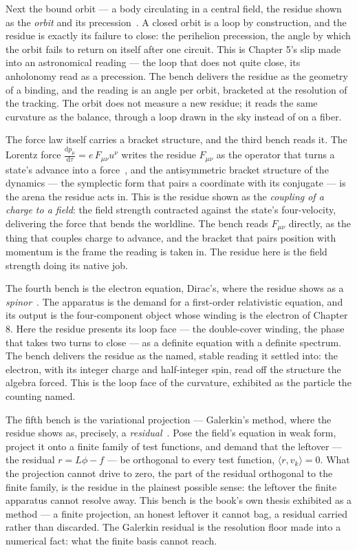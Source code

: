 Next the bound orbit --- a body circulating in a central field, the residue shown as the \emph{orbit} and its
precession~\cite{newton1687,goldstein2002}. A closed orbit is a loop by construction, and the residue is exactly its failure
to close: the perihelion precession, the angle by which the orbit fails to return on itself after one circuit. This is
Chapter 5's slip made into an astronomical reading --- the loop that does not quite close, its anholonomy read as a
precession. The bench delivers the residue as the geometry of a binding, and the reading is an angle per orbit, bracketed at
the resolution of the tracking. The orbit does not measure a new residue; it reads the same curvature as the balance, through
a loop drawn in the sky instead of on a fiber.

The force law itself carries a bracket structure, and the third bench reads it. The Lorentz force $\frac{\mathrm{d}p_\mu}
{\mathrm{d}\tau} = e\,F_{\mu\nu}u^\nu$ writes the residue $F_{\mu\nu}$ as the operator that turns a state's advance into a
force~\cite{lorentz1904}, and the antisymmetric bracket structure of the dynamics --- the symplectic form that pairs a
coordinate with its conjugate --- is the arena the residue acts in. This is the residue shown as the \emph{coupling of a
charge to a field}: the field strength contracted against the state's four-velocity, delivering the force that bends the
worldline. The bench reads $F_{\mu\nu}$ directly, as the thing that couples charge to advance, and the bracket that pairs
position with momentum is the frame the reading is taken in. The residue here is the field strength doing its native job.

The fourth bench is the electron equation, Dirac's, where the residue shows as a \emph{spinor}~\cite{dirac1928}. The
apparatus is the demand for a first-order relativistic equation, and its output is the four-component object whose winding is
the electron of Chapter 8. Here the residue presents its loop face --- the double-cover winding, the phase that takes two
turns to close --- as a definite equation with a definite spectrum. The bench delivers the residue as the named, stable
reading it settled into: the electron, with its integer charge and half-integer spin, read off the structure the algebra
forced. This is the loop face of the curvature, exhibited as the particle the counting named.

The fifth bench is the variational projection --- Galerkin's method, where the residue shows as, precisely, a
\emph{residual}~\cite{galerkin1915}. Pose the field's equation in weak form, project it onto a finite family of test
functions, and demand that the leftover --- the residual $r = L\phi - f$ --- be orthogonal to every test function, $\langle
r, v_k \rangle = 0$. What the projection cannot drive to zero, the part of the residual orthogonal to the finite family, is
the residue in the plainest possible sense: the leftover the finite apparatus cannot resolve away. This bench is the book's
own thesis exhibited as a method --- a finite projection, an honest leftover it cannot bag, a residual carried rather than
discarded. The Galerkin residual is the resolution floor made into a numerical fact: what the finite basis cannot reach.

